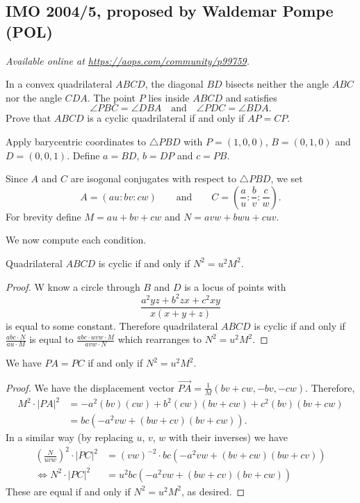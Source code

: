 \documentclass[11pt]{scrartcl}
\begin{document}
\subsection{IMO 2004/5, proposed by Waldemar Pompe (POL)}
\textsl{Available online at \url{https://aops.com/community/p99759}.}
\begin{mdframed}[style=mdpurplebox,frametitle={Problem statement}]
In a convex quadrilateral $ABCD$,
the diagonal $BD$ bisects neither the angle $ABC$ nor the angle $CDA$.
The point $P$ lies inside $ABCD$ and satisfies
\[\angle PBC=\angle DBA \quad\text{and}\quad \angle PDC=\angle BDA. \]
Prove that $ABCD$ is a cyclic quadrilateral
if and only if $AP=CP$.
\end{mdframed}
Apply barycentric coordinates to $\triangle PBD$
with $P = (1,0,0)$, $B = (0,1,0)$ and $D = (0,0,1)$.
Define $a = BD$, $b = DP$ and $c = PB$.

Since $A$ and $C$ are isogonal conjugates with respect to $\triangle PBD$,
we set \[ A = (au : bv : cw) \qquad\text{and}\qquad
  C = \left( \frac au : \frac bv : \frac cw \right). \]
For brevity define $M = au + bv + cw$ and $N = avw + bwu + cuv$.

We now compute each condition.
\begin{claim*}
  Quadrilateral $ABCD$ is cyclic if and only if $N^2 = u^2 M^2$.
\end{claim*}
\begin{proof}
  W know a circle through $B$ and $D$
  is a locus of points
  with \[ \frac{a^2yz+b^2zx+c^2xy}{x(x+y+z)} \]
  is equal to some constant.
  Therefore quadrilateral $ABCD$ is cyclic if and only if
  $\frac{abc \cdot N}{au \cdot M}$
  is equal to $\frac{abc \cdot uvw \cdot M}{avw \cdot N}$
  which rearranges to $N^2 = u^2M^2$.
\end{proof}
\begin{claim*}
  We have $PA = PC$ if and only if $N^2 = u^2 M^2$.
\end{claim*}
\begin{proof}
  We have the displacement vector
  $\overrightarrow{PA}
  = \tfrac{1}{M} \left( bv+cw , -bv ,-cw \right)$.
  Therefore,
  \begin{align*}
    M^2 \cdot \left\lvert PA \right\rvert^2
    &= -a^2(bv)(cw) + b^2(cw)(bv+cw) + c^2(bv)(bv+cw) \\
    &= bc(-a^2vw + (bw+cv)(bv+cw)).
  \end{align*}
  In a similar way
  (by replacing $u$, $v$, $w$ with their inverses)
  we have
  \begin{align*}
    \left( \frac{N}{uvw} \right)^2 \cdot \left\lvert PC \right\rvert^2
    &= (vw)^{-2} \cdot bc(-a^2vw + (bv+cw)(bw+cv)) \\
    \iff N^2 \cdot \left\lvert PC \right\rvert^2
    & = u^2 bc(-a^2vw + (bw+cv)(bv+cw))
  \end{align*}
  These are equal if and only if $N^2 = u^2M^2$, as desired.
\end{proof}
\pagebreak
\end{document}
